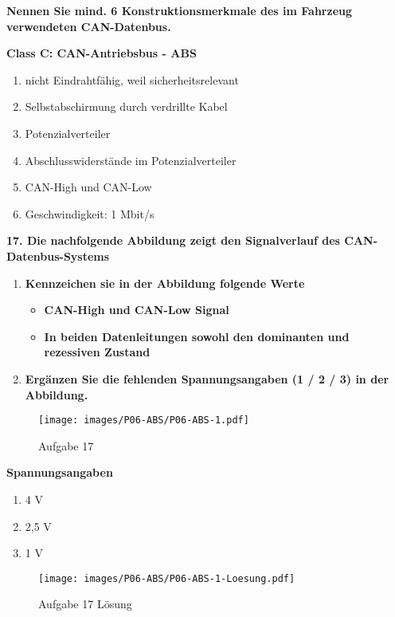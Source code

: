 \textbf{Nennen Sie mind. 6 Konstruktionsmerkmale des im Fahrzeug
verwendeten CAN-Datenbus.}

\textbf{Class C: CAN-Antriebsbus - ABS}

\begin{enumerate}
\item
  nicht Eindrahtfähig, weil sicherheitsrelevant
\item
  Selbstabschirmung durch verdrillte Kabel
\item
  Potenzialverteiler
\item
  Abschlusswiderstände im Potenzialverteiler
\item
  CAN-High und CAN-Low
\item
  Geschwindigkeit: 1 Mbit/s
\end{enumerate}

\newpage

\textbf{17. Die nachfolgende Abbildung zeigt den Signalverlauf des
CAN-Datenbus-Systems}

\begin{enumerate}
\item
  \textbf{Kennzeichen sie in der Abbildung folgende Werte}

  \begin{itemize}
  \item
    \textbf{CAN-High und CAN-Low Signal}
  \item
    \textbf{In beiden Datenleitungen sowohl den dominanten und
    rezessiven Zustand}
  \end{itemize}
\item
  \textbf{Ergänzen Sie die fehlenden Spannungsangaben (1 / 2 / 3) in der
  Abbildung.}
\end{enumerate}

\begin{figure}[!ht]%
\centering
\texttt{[image: images/P06-ABS/P06-ABS-1.pdf]}
\caption{Aufgabe 17}
\end{figure}

\textbf{Spannungsangaben}

\begin{enumerate}
\item
  4 V
\item
  2,5 V
\item
  1 V
\end{enumerate}

\begin{figure}[!ht]%
\centering
\texttt{[image: images/P06-ABS/P06-ABS-1-Loesung.pdf]}
\caption{Aufgabe 17 Lösung}
\end{figure}
